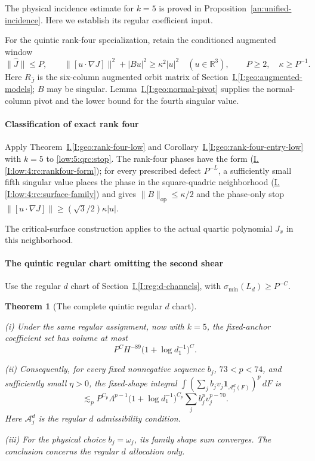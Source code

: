 \documentclass[11pt]{amsart}
\newtheorem{theorem}{Theorem}[section]
\theoremstyle{definition}
\theoremstyle{remark}
\numberwithin{equation}{section}
\newcommand{\partIref}[1]{\hyperref[I:#1]{I.\ref*{I:#1}}}
\newcommand{\partIeqref}[1]{\textup{(\partIref{#1})}}
\begin{document}
The physical incidence estimate for $k=5$ is proved in Proposition~\ref{an:unified-incidence}. Here we establish its regular coefficient input.

For the quintic rank-four specialization, retain the conditioned augmented window
\begin{equation}\label{low:5:qrc:stop}
\|\widehat J\|\le P,\qquad \|[u\cdot\nabla J]\|^2+|Bu|^2\ge\kappa^2|u|^2\quad(u\in\mathbb R^3),\qquad P\ge2,\quad\kappa\ge P^{-1}.
\end{equation}
Here $R_{\widehat J}$ is the six-column augmented orbit matrix of Section~\partIref{geo:augmented-models}; $B$ may be singular. Lemma~\partIref{geo:normal-pivot} supplies the normal-column pivot and the lower bound for the fourth singular value.

\paragraph{Classification of exact rank four}

Apply Theorem~\partIref{geo:rank-four-low} and Corollary~\partIref{geo:rank-four-entry-low} with $k=5$ to \eqref{low:5:qrc:stop}. The rank-four phases have the form \partIeqref{low:4:rc:rankfour-form}; for every prescribed defect $P^{-L}$, a sufficiently small fifth singular value places the phase in the square-quadric neighborhood \partIeqref{low:4:rc:surface-family} and gives $\|B\|_{\mathrm{op}}\le\kappa/2$ and the phase-only stop $\|[u\cdot\nabla J]\|\ge(\sqrt3/2)\kappa|u|$.

The critical-surface construction applies to the actual quartic polynomial $J_x$ in this neighborhood.

\paragraph{The quintic regular chart omitting the second shear}

Use the regular $d$ chart of Section~\partIref{reg:d-channels}, with $\sigma_{\min}(L_d)\ge P^{-C}$. 

\begin{theorem}[The complete quintic regular $d$ chart]\label{low:5:rd5:theorem}

\noindent\textup{(i)} Under the same regular assignment, now with $k=5$, the fixed-anchor coefficient set has volume at most
\[
P^C H^{-89}\bigl(1+\log d_1^{-1}\bigr)^C.
\]

\noindent\textup{(ii)} Consequently, for every fixed nonnegative sequence $b_j$, $73<p<74$, and sufficiently small $\eta>0$, the fixed-shape integral $\int(\sum_j b_jv_j\mathbf1_{\mathcal A_j^{d}(F)})^p\,dF$ is
\[
\lesssim_p P^{C_p}\Lambda^{p-1}\bigl(1+\log d_1^{-1}\bigr)^{C_p}\sum_j b_j^pv_j^{p-70}.
\]
Here $\mathcal A_j^d$ is the regular $d$ admissibility condition.

\noindent\textup{(iii)} For the physical choice $b_j=\omega_j$, its family shape sum converges. The conclusion concerns the regular $d$ allocation only.
\end{theorem}
\end{document}
